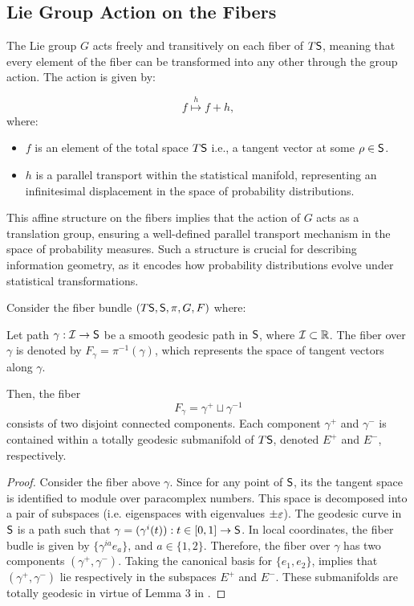 \subsection{Lie Group Action on the Fibers}
The Lie group $G$  acts freely and transitively on each fiber of $T\mathsf{S}$, meaning that every element of the fiber can be transformed into any other through the group action. The action is given by:

\[f\overset{h}{\mapsto} f+h,\]
where:
\begin{itemize}
    \item $f$ is an element of the total space $T\mathsf{S}$ i.e., a tangent vector at some $\rho\in \mathsf{S}$.

    \item $h$ is a parallel transport within the statistical manifold, representing an infinitesimal displacement in the space of probability distributions.
\end{itemize}


This affine structure on the fibers implies that the action of $G$
acts as a translation group, ensuring a well-defined parallel transport mechanism in the space of probability measures. Such a structure is crucial for describing information geometry, as it encodes how probability distributions evolve under statistical transformations.



\begin{lemma}
Consider the fiber bundle $(T\mathsf{S},\mathsf{S},\pi,G,F)$ where: 

Let path $\gamma:\mathcal{I}\to \mathsf{S}$ be a smooth geodesic path in $\mathsf{S}$, where $\mathcal{I}\subset \mathbb{R}$. 
The fiber over $\gamma$ is denoted by $F_{\gamma}=\pi^{-1}(\gamma)$, which represents the space of tangent vectors along $\gamma$. 

Then, the fiber \[F_{\gamma}=\gamma^+\sqcup\gamma^{-1}\] consists of two disjoint connected components. Each component $\gamma^+$ and $\gamma^-$ is contained within a totally geodesic submanifold of $T\mathsf{S}$, denoted $E^+$ and $E^-$, respectively. 
\end{lemma}
\begin{proof}
Consider the fiber above $\gamma$. Since for any point of $\mathsf{S}$, its the tangent space is identified to  module over paracomplex numbers. This space is decomposed into a pair of subspaces (i.e. eigenspaces with eigenvalues $\pm \varepsilon$).
The geodesic curve in $\mathsf{S}$ is a path such that $\gamma=(\gamma^i(t)): t\in [0,1]\to \mathsf{S}$. In local coordinates, the fiber budle is given by $\{\gamma^{ia}e_{a}\}$, and $a\in \{1,2\}$. Therefore, the fiber over $\gamma$ has two components $(\gamma^+,\gamma^-)$. Taking the canonical basis for $\{e_1,e_2\}$, implies that $(\gamma^+,\gamma^-)$ lie respectively in the subspaces $E^+$ and $E^-$. These submanifolds are totally geodesic in virtue of  Lemma 3 in \cite{CoCoNen}. \end{proof}

